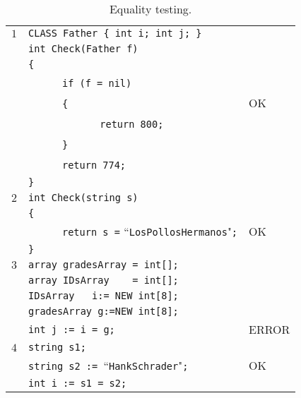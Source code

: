 \documentclass{article}
\begin{document}
\begin{table}[h]
\centering
\begin{tabular}{|l|l|l|}
\hline
 $1$ & \verb"CLASS Father { int i; int j; }" &    \\
     & \verb"int Check(Father f)"            &    \\
     & \verb"{"                              &    \\
     & ~ ~ ~ ~\verb"if (f = nil)"           &    \\
     & ~ ~ ~ ~\verb"{"                       & OK \\
     & ~ ~ ~ ~ ~ ~ ~ ~\verb"return 800;"     &    \\
     & ~ ~ ~ ~\verb"}"                       &    \\
     & ~ ~ ~ ~\verb"return 774;"             &    \\
     & \verb"}"                              &    \\
\hline
 $2$ & \verb"int Check(string s)"                                   &    \\
     & \verb"{"                                                     &    \\
     & ~ ~ ~ ~\verb"return s =" ``\verb"LosPollosHermanos""\verb";" & OK \\
     & \verb"}"                                                     &    \\
\hline
 $3$ & \verb"array gradesArray = int[];"        &       \\
     & \verb"array IDsArray    = int[];"        &       \\
     & \verb"IDsArray   i:= NEW int[8];"       &       \\
     & \verb"gradesArray g:=NEW int[8];"       &       \\
     & \verb"int j := i = g;"                  & ERROR \\
\hline
 $4$ & \verb"string s1;"                                  &    \\
     & \verb"string s2 := "``\verb"HankSchrader""\verb";" & OK \\
     & \verb"int i := s1 = s2;"                           &    \\
\hline
\end{tabular}
\caption{Equality testing.
\label{Table_Code_Examples_Equality_Testing}}
\end{table}
\newpage
\end{document}
